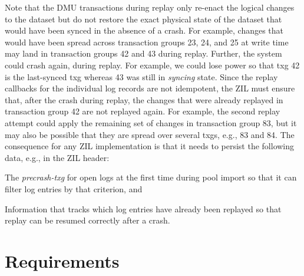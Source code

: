 \documentclass[12pt,a4paper,twoside]{book}
\begin{document}
Note that the DMU transactions during replay only re-enact the logical changes to the dataset but do not restore the exact physical state of the dataset that would have been synced in the absence of a crash.
For example, changes that would have been spread across transaction groups 23, 24, and 25 at write time may land in transaction groups 42 and 43 during replay.
Further, the system could crash again, during replay.
For example, we could lose power so that txg 42 is the last-synced txg whereas 43 was still in \textit{syncing} state.
Since the replay callbacks for the individual log records are not idempotent, the ZIL must ensure that, after the crash during replay, the changes that were already replayed in transaction group 42 are not replayed again.
For example, the second replay attempt could apply the remaining set of changes in transaction group 83, but it may also be possible that they are spread over several txgs, e.g., 83 and 84.
The consequence for any ZIL implementation is that it needs to persist the following data, e.g., in the ZIL header:
\begin{description}[noitemsep,leftmargin=1.5cm,labelindent=1cm]
    \item[Precrash-txg] The \textit{precrash-txg} for open logs at the first time during pool import so that it can filter log entries by that criterion, and
    \item[Replay progress] Information that tracks which log entries have already been replayed so that replay can be resumed correctly after a crash.
\end{description}

\section{Requirements}\label{di:prb:analysis}
\end{document}
